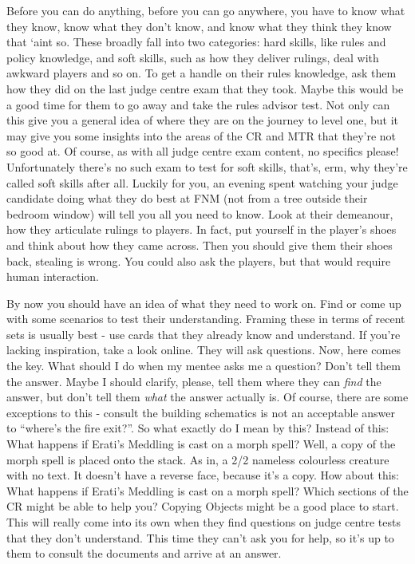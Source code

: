 \documentclass[10pt,a4paper]{article}
\begin{document}
Before you can do anything, before you can go anywhere, you have to know what they know, know what they don't know, and know what they think they know that `aint so. These broadly fall into two categories: hard skills, like rules and policy knowledge, and soft skills, such as how they deliver rulings, deal with awkward players and so on. To get a handle on their rules knowledge, ask them how they did on the last judge centre exam that they took. Maybe this would be a good time for them to go away and take the rules advisor test. Not only can this give you a general idea of where they are on the journey to level one, but it may give you some insights into the areas of the CR and MTR that they're not so good at. Of course, as with all judge centre exam content, no specifics please! Unfortunately there's no such exam to test for soft skills, that's, erm, why they're called soft skills after all. Luckily for you, an evening spent watching your judge candidate doing what they do best at FNM (not from a tree outside their bedroom window) will tell you all you need to know. Look at their demeanour, how they articulate rulings to players. In fact, put yourself in the player's shoes and think about how they came across. Then you should give them their shoes back, stealing is wrong. You could also ask the players, but that would require human interaction.

By now you should have an idea of what they need to work on. Find or come up with some scenarios to test their understanding. Framing these in terms of recent sets is usually best - use cards that they already know and understand. If you're lacking inspiration, take a look online. They will ask questions. Now, here comes the key. What should I do when my mentee asks me a question? Don't tell them the answer. Maybe I should clarify, please, tell them where they can \textit{find} the answer, but don't tell them \textit{what} the answer actually is. Of course, there are some exceptions to this - consult the building schematics is not an acceptable answer to ``where's the fire exit?''. So what exactly do I mean by this? Instead of this: 
\newline
\lbrack What happens if Erati's Meddling is cast on a morph spell?\rbrack
\newline
\lbrack Well, a copy of the morph spell is placed onto the stack. As in, a 2/2 nameless colourless creature with no text. It doesn't have a reverse face, because it's a copy.\rbrack
\newline
How about this:
\newline
\lbrack What happens if Erati's Meddling is cast on a morph spell?\rbrack
\newline
\lbrack
Which sections of the CR might be able to help you? Copying Objects might be a good place to start.\rbrack
\newline
This will really come into its own when they find questions on judge centre tests that they don't understand. This time they can't ask you for help, so it's up to them to consult the documents and arrive at an answer.
\end{document}
